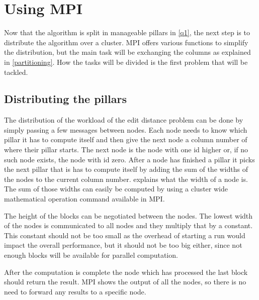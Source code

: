 \section{Using MPI}
Now that the algorithm is split in manageable pillars in \cref{q1}, the next step is to distribute the algorithm over a cluster.
MPI offers various functions to simplify the distribution, but the main task will be exchanging the columns as explained in \cref{partitioning}.
How the tasks will be divided is the first problem that will be tackled.

\subsection{Distributing the pillars}
The distribution of the workload of the edit distance problem can be done by simply passing a few messages between nodes.
Each node needs to know which pillar it has to compute itself and then give the next node a column number of where their pillar starts.
The next node is the node with one id higher or, if no such node exists, the node with id zero.
After a node has finished a pillar it picks the next pillar that is has to compute itself by adding the sum of the widths of the nodes to the current column number.
 explains what the width of a node is.
The sum of those widths can easily be computed by using a cluster wide mathematical operation command available in MPI.

The height of the blocks can be negotiated between the nodes.
The lowest width of the nodes is communicated to all nodes and they multiply that by a constant.
This constant should not be too small as the overhead of starting a run would impact the overall performance, but it should not be too big either, since not enough blocks will be available for parallel computation.

After the computation is complete the node which has processed the last block should return the result.
MPI shows the output of all the nodes, so there is no need to forward any results to a specific node.

